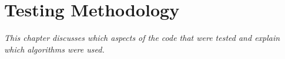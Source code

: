 \chapter{Testing Methodology}

\textit{This chapter discusses which aspects of the code that were tested and explain which algorithms were used.}






